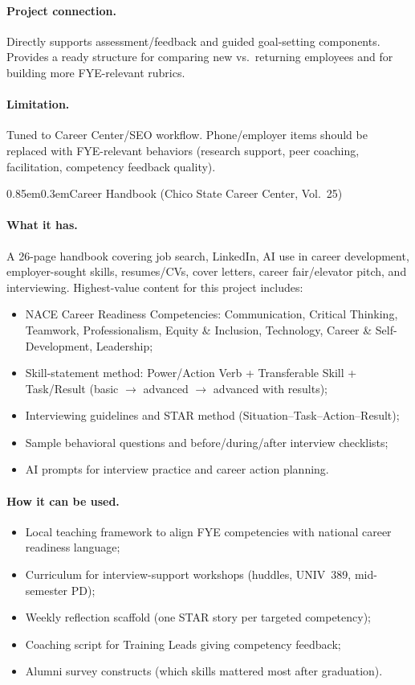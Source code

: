 \documentclass[11pt,letterpaper]{article}
\makeatletter
\renewcommand\subsection{\@startsection{subsection}{2}{\z@}%
  {0.85em}{0.3em}{\normalsize\bfseries}}
\makeatother
\begin{document}
\paragraph{Project connection.}
Directly supports assessment/feedback and guided goal-setting components. Provides a ready structure for comparing new vs.\ returning employees and for building more FYE-relevant rubrics.

\paragraph{Limitation.}
Tuned to Career Center/SEO workflow. Phone/employer items should be replaced with FYE-relevant behaviors (research support, peer coaching, facilitation, competency feedback quality).

\subsection{Career Handbook (Chico State Career Center, Vol.~25)}
\paragraph{What it has.}
A 26-page handbook covering job search, LinkedIn, AI use in career development, employer-sought skills, resumes/CVs, cover letters, career fair/elevator pitch, and interviewing. Highest-value content for this project includes:
\begin{itemize}
  \item NACE Career Readiness Competencies: Communication, Critical Thinking, Teamwork, Professionalism, Equity \& Inclusion, Technology, Career \& Self-Development, Leadership;
  \item Skill-statement method: Power/Action Verb + Transferable Skill + Task/Result (basic $\rightarrow$ advanced $\rightarrow$ advanced with results);
  \item Interviewing guidelines and STAR method (Situation--Task--Action--Result);
  \item Sample behavioral questions and before/during/after interview checklists;
  \item AI prompts for interview practice and career action planning.
\end{itemize}

\paragraph{How it can be used.}
\begin{itemize}
  \item Local teaching framework to align FYE competencies with national career readiness language;
  \item Curriculum for interview-support workshops (huddles, UNIV~389, mid-semester PD);
  \item Weekly reflection scaffold (one STAR story per targeted competency);
  \item Coaching script for Training Leads giving competency feedback;
  \item Alumni survey constructs (which skills mattered most after graduation).
\end{itemize}
\end{document}
